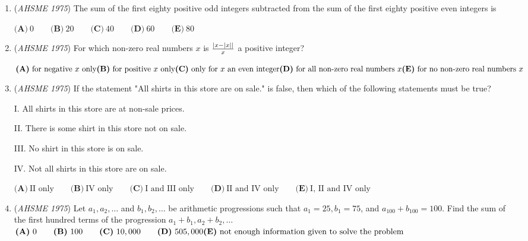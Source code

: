 \begin{enumerate}
 $\textbf{(A)}\ 1/5 \qquad  \textbf{(B)}\ 4/5 \qquad  \textbf{(C)}\ 1/4 \qquad  \textbf{(D)}\ 3/4 \qquad  \textbf{(E)}\ 8/9$


	\item (\textit{AHSME 1975}) The sum of the first eighty positive odd integers subtracted from the sum of the first eighty positive even integers is 


 $\textbf{(A)}\ 0 \qquad  \textbf{(B)}\ 20 \qquad  \textbf{(C)}\ 40 \qquad  \textbf{(D)}\ 60 \qquad  \textbf{(E)}\ 80$


	\item (\textit{AHSME 1975}) For which non-zero real numbers $x$ is $\frac{|x-|x|\-|}{x}$ a positive integer? 


 $\textbf{(A)}\ \text{for negative } x \text{ only} \qquad \\ \textbf{(B)}\ \text{for positive } x \text{ only} \qquad \\ \textbf{(C)}\ \text{only for } x \text{ an even integer} \qquad \\ \textbf{(D)}\ \text{for all non-zero real numbers } x \\ \textbf{(E)}\ \text{for no non-zero real numbers } x$


	\item (\textit{AHSME 1975}) If the statement "All shirts in this store are on sale." is false, then which of the following statements must be true? 


 I. All shirts in this store are at non-sale prices. 


 II. There is some shirt in this store not on sale. 


 III. No shirt in this store is on sale. 


 IV. Not all shirts in this store are on sale. 


 

$\textbf{(A)}\ \text{II only} \qquad  \textbf{(B)}\ \text{IV only} \qquad  \textbf{(C)}\ \text{I and III only} \qquad  \textbf{(D)}\ \text{II and IV only} \qquad  \textbf{(E)}\ \text{I, II and IV only}$


	\item (\textit{AHSME 1975}) Let $a_1, a_2, \ldots$ and $b_1, b_2, \ldots$ be arithmetic progressions such that $a_1 = 25, b_1 = 75$, and $a_{100} + b_{100} = 100$. 
Find the sum of the first hundred terms of the progression $a_1 + b_1, a_2 + b_2, \ldots$
$\textbf{(A)}\ 0 \qquad  \textbf{(B)}\ 100 \qquad  \textbf{(C)}\ 10,000 \qquad  \textbf{(D)}\ 505,000 \qquad \\ \textbf{(E)}\ \text{not enough information given to solve the problem}$



\end{enumerate}
